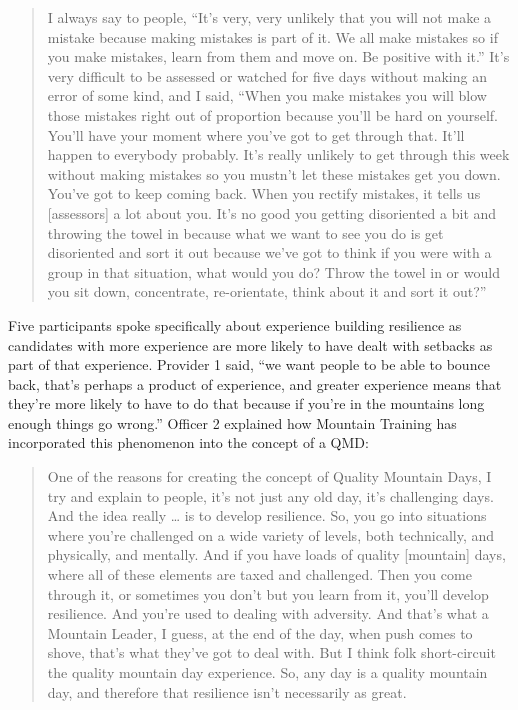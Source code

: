 \documentclass[
  12pt,
  a4paper,
]{book}
\begin{document}
\begin{quote}
I always say to people, ``It's very, very unlikely that you will not make a mistake because making mistakes is part of it. We all make mistakes so if you make mistakes, learn from them and move on. Be positive with it.'' It's very difficult to be assessed or watched for five days without making an error of some kind, and I said, ``When you make mistakes you will blow those mistakes right out of proportion because you'll be hard on yourself. You'll have your moment where you've got to get through that. It'll happen to everybody probably. It's really unlikely to get through this week without making mistakes so you mustn't let these mistakes get you down. You've got to keep coming back. When you rectify mistakes, it tells us {[}assessors{]} a lot about you. It's no good you getting disoriented a bit and throwing the towel in because what we want to see you do is get disoriented and sort it out because we've got to think if you were with a group in that situation, what would you do? Throw the towel in or would you sit down, concentrate, re-orientate, think about it and sort it out?''
\end{quote}

Five participants spoke specifically about experience building resilience as candidates with more experience are more likely to have dealt with setbacks as part of that experience. Provider 1 said, ``we want people to be able to bounce back, that's perhaps a product of experience, and greater experience means that they're more likely to have to do that because if you're in the mountains long enough things go wrong.'' Officer 2 explained how Mountain Training has incorporated this phenomenon into the concept of a QMD:

\begin{quote}
One of the reasons for creating the concept of Quality Mountain Days, I try and explain to people, it's not just any old day, it's challenging days. And the idea really \ldots{} is to develop resilience. So, you go into situations where you're challenged on a wide variety of levels, both technically, and physically, and mentally. And if you have loads of quality {[}mountain{]} days, where all of these elements are taxed and challenged. Then you come through it, or sometimes you don't but you learn from it, you'll develop resilience. And you're used to dealing with adversity. And that's what a Mountain Leader, I guess, at the end of the day, when push comes to shove, that's what they've got to deal with. But I think folk short-circuit the quality mountain day experience. So, any day is a quality mountain day, and therefore that resilience isn't necessarily as great.
\end{quote}
\end{document}
